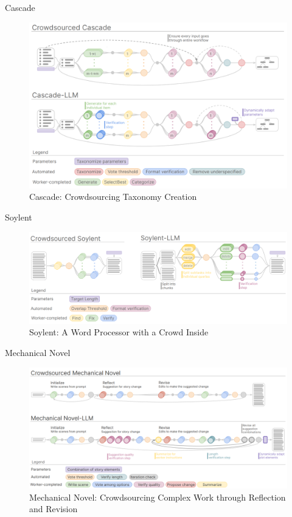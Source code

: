 \documentclass{beamer}
\begin{document}
\begin{frame}{Cascade}
    \begin{figure}[c]
        \centering
        \includegraphics[height=.8\textheight]{pic/2.png}
        \caption{Cascade: Crowdsourcing Taxonomy Creation}
    \end{figure}
\end{frame}

\begin{frame}{Soylent}
    \begin{figure}[c]
        \centering
        \includegraphics[height=.5\textheight]{pic/3.png}
        \caption{Soylent: A Word Processor with a Crowd Inside}
    \end{figure}
\end{frame}

\begin{frame}{Mechanical Novel}
    \begin{figure}[c]
        \centering
        \includegraphics[height=.6\textheight]{pic/4.png}
        \caption{Mechanical Novel: Crowdsourcing Complex Work through Reflection and Revision}
    \end{figure}
\end{frame}
\end{document}
